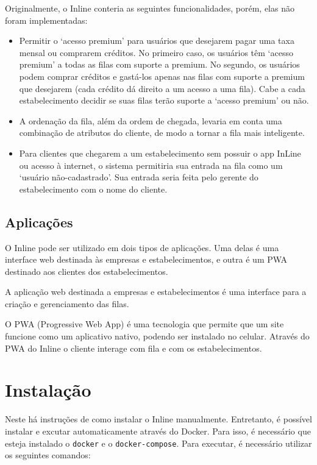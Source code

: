\documentclass{book}
\begin{document}
Originalmente, o Inline conteria as seguintes funcionalidades, porém, elas não
foram implementadas:

\begin{itemize}
\item Permitir o ‘acesso premium’ para usuários que desejarem pagar uma taxa
  mensal ou comprarem créditos. No primeiro caso, os usuários têm ‘acesso
  premium’ a todas as filas com suporte a premium. No segundo, os usuários podem
  comprar créditos e gastá-los apenas nas filas com suporte a premium que
  desejarem (cada crédito dá direito a um acesso a uma fila). Cabe a cada
  estabelecimento decidir se suas filas terão suporte a ‘acesso premium’ ou não.

\item A ordenação da fila, além da ordem de chegada, levaria em conta uma
  combinação de atributos do cliente, de modo a tornar a fila mais inteligente.

\item Para clientes que chegarem a um estabelecimento sem possuir o app InLine
  ou acesso à internet, o sistema permitiria sua entrada na fila como um
  ‘usuário não-cadastrado’. Sua entrada seria feita pelo gerente do
  estabelecimento com o nome do cliente.
\end{itemize}

\section{Aplicações}
O Inline pode ser utilizado em dois tipos de aplicações. Uma delas é uma
interface web destinada às empresas e estabelecimentos, e outra é um PWA
destinado aos clientes dos estabelecimentos.

A aplicação web destinada a empresas e estabelecimentos é uma interface para a
criação e gerenciamento das filas.

O PWA (Progressive Web App) é uma tecnologia que permite que um site funcione
como um aplicativo nativo, podendo ser instalado no celular. Através do PWA
do Inline o cliente interage com fila e com os estabelecimentos.

\chapter{Instalação}

Neste há instruções de como instalar o Inline manualmente. Entretanto, é
possível instalar e excutar automaticamente através do Docker. Para isso, é
necessário que esteja instalado o \verb|docker| e o \verb|docker-compose|. Para
executar, é necessário utilizar os seguintes comandos:
\end{document}
